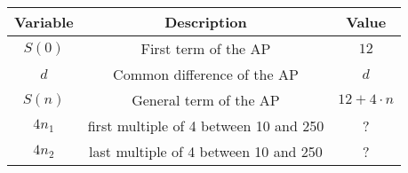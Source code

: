 \begin{tabular}[12.1pt]{ |c| c| c|}
    \hline
    \textbf{Variable} & \textbf{Description} &\textbf{Value}\\ 
    \hline
    $S(0)$ & First term of the AP & $12$ \\
    \hline 
    $d$ & Common difference of the AP &$d$ \\
    \hline 
    $S(n)$ & General term of the AP & $12+4\cdot n$\\
    \hline
    $4n_{1}$ & first multiple of 4 between 10 and 250 & ?\\
    \hline
    $4n_{2}$ & last multiple of 4 between 10 and 250 & ?\\
    \hline
    \end{tabular}
